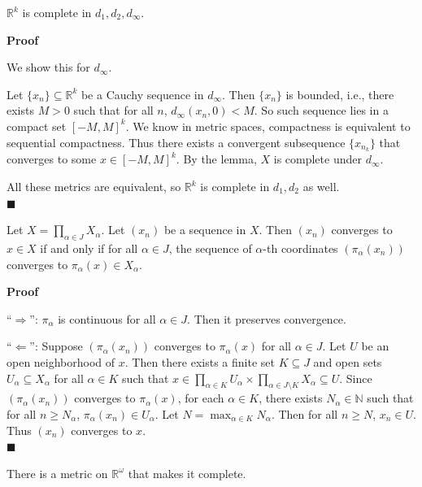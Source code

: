 \documentclass[main.tex]{subfiles}
\begin{document}
\begin{theorem}
    $\mathbb{R}^k$ is complete in $d_1, d_2, d_{\infty}$.
\end{theorem}
\par \noindent \textbf{Proof} 
\par We show this for $d_{\infty}$. 
\par Let $\{x_n\} \subseteq \mathbb{R}^k$ be a Cauchy sequence in $d_{\infty}$. 
Then $\{x_n\}$ is bounded, i.e., there exists $M > 0$ such that for all $n$, $d_{\infty}(x_n, 0) < M$. So such sequence lies in a compact set $[-M, M]^k$. We know in metric spaces, compactness is equivalent to sequential compactness. Thus there exists a convergent subsequence $\{x_{n_k}\}$ that converges to some $x \in [-M, M]^k$. By the lemma, $X$ is complete under $d_{\infty}$.  
\par All these metrics are equivalent, so $\mathbb{R}^k$ is complete in $d_1, d_2$ as well. 
\mbox{} \\ \null \hfill $\blacksquare$ 


\begin{lemma}
    Let $X = \prod_{\alpha \in J} X_{\alpha}$. Let $(x_n)$ be a sequence in $X$. Then $(x_n)$ converges to $x \in X$ if and only if for all $\alpha \in J$, the sequence of $\alpha$-th coordinates $(\pi_{\alpha}(x_n))$ converges to $\pi_{\alpha}(x)\in X_{\alpha}$.
\end{lemma}
\par \noindent \textbf{Proof} 
\par ``$\Rightarrow$'': $\pi_{\alpha}$ is continuous for all $\alpha \in J$. Then it preserves convergence. 
\par ``$\Leftarrow$'': Suppose $(\pi_{\alpha}(x_n))$ converges to $\pi_{\alpha}(x)$ for all $\alpha \in J$. Let $U$ be an open neighborhood of $x$. Then there exists a finite set $K \subseteq J$ and open sets $U_{\alpha} \subseteq X_{\alpha}$ for all $\alpha \in K$ such that $x \in \prod_{\alpha \in K} U_{\alpha} \times \prod_{\alpha \in J \setminus K} X_{\alpha} \subseteq U$. Since $(\pi_{\alpha}(x_n))$ converges to $\pi_{\alpha}(x)$, for each $\alpha \in K$, there exists $N_{\alpha} \in \mathbb{N}$ such that for all $n \geq N_{\alpha}$, $\pi_{\alpha}(x_n) \in U_{\alpha}$. Let $N = \max_{\alpha \in K} N_{\alpha}$. Then for all $n \geq N$, $x_n \in U$. Thus $(x_n)$ converges to $x$.
\mbox{} \\ \null \hfill $\blacksquare$ 
\begin{theorem}
    There is a metric on $\mathbb{R}^{\omega}$ that makes it complete.
\end{theorem}
\end{document}
